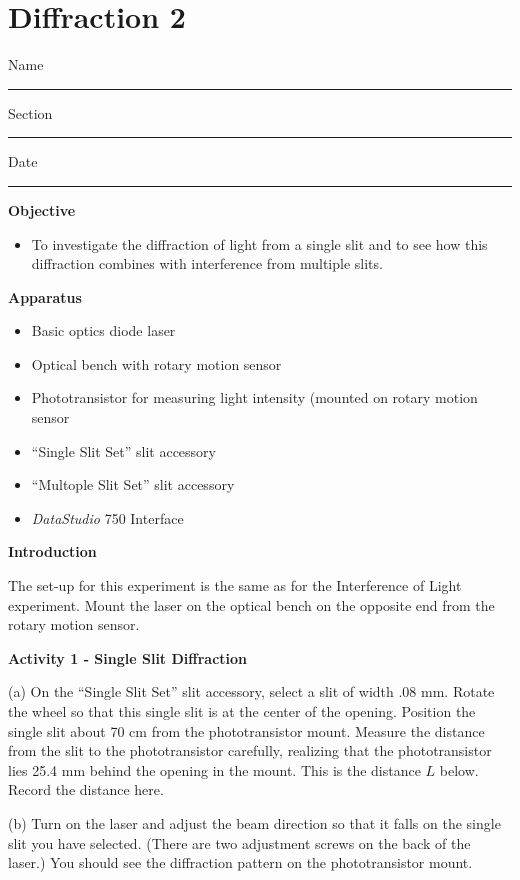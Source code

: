 \section{Diffraction 2}

Name \rule{2.0in}{0.1pt}\hfill{}Section \rule{1.0in}{0.1pt}\hfill{}Date
\rule{1.0in}{0.1pt}

\textbf{Objective}

\begin{itemize}
\item To investigate the diffraction of light from a single slit and to see how 
this diffraction combines with interference from multiple slits.
\end{itemize}

\textbf{Apparatus}

\begin{itemize}
\item Basic optics diode laser
\item Optical bench with rotary motion sensor
\item Phototransistor for measuring light intensity (mounted on rotary motion 
sensor
\item ``Single Slit Set'' slit accessory
\item ``Multople Slit Set'' slit accessory
\item {\it DataStudio} 750 Interface
\end{itemize}

\textbf{Introduction}

The set-up for this experiment is the same as for the Interference of Light 
experiment. Mount the laser on the optical bench on the opposite end from the 
rotary motion sensor. 

\textbf{Activity 1 - Single Slit Diffraction}

(a) On the ``Single Slit Set'' slit accessory, select a slit of width .08 mm. 
Rotate the wheel so that this single slit is at the center of the opening. 
Position the single slit about 70 cm from the phototransistor mount. Measure 
the distance from the slit to the phototransistor carefully, realizing that 
the phototransistor lies 25.4 mm behind the opening in the mount. This is the 
distance $L$ below. Record the distance here.
\vspace{10mm}

(b) Turn on the laser and adjust the beam direction so that it falls on the 
single slit you have selected. (There are two adjustment screws on the back 
of the laser.) You should see the diffraction pattern on the phototransistor 
mount.

